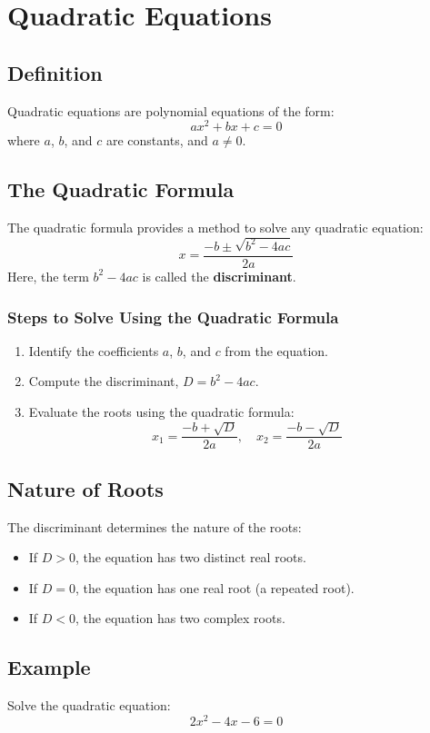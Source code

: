 \section{Quadratic Equations}

\subsection{Definition}
Quadratic equations are polynomial equations of the form:
\[
    ax^2 + bx + c = 0
\]
where \(a\), \(b\), and \(c\) are constants, and \(a \neq 0\).

\subsection{The Quadratic Formula}
The quadratic formula provides a method to solve any quadratic equation:
\[
    x = \frac{-b \pm \sqrt{b^2 - 4ac}}{2a}
\]
Here, the term \(b^2 - 4ac\) is called the \textbf{discriminant}.

\subsubsection{Steps to Solve Using the Quadratic Formula}
\begin{enumerate}
    \item Identify the coefficients \(a\), \(b\), and \(c\) from the equation.
    \item Compute the discriminant, \(D = b^2 - 4ac\).
    \item Evaluate the roots using the quadratic formula:
          \[
              x_1 = \frac{-b + \sqrt{D}}{2a}, \quad x_2 = \frac{-b - \sqrt{D}}{2a}
          \]
\end{enumerate}

\subsection{Nature of Roots}
The discriminant determines the nature of the roots:
\begin{itemize}
    \item If \(D > 0\), the equation has two distinct real roots.
    \item If \(D = 0\), the equation has one real root (a repeated root).
    \item If \(D < 0\), the equation has two complex roots.
\end{itemize}

\subsection{Example}
Solve the quadratic equation:
\[
    2x^2 - 4x - 6 = 0
\]

